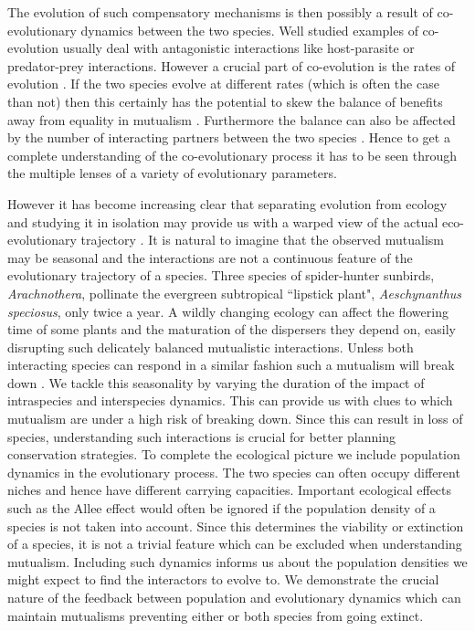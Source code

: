 \documentclass[12pt]{article}
\begin{document}
The evolution of such compensatory mechanisms is then possibly a result of co-evolutionary dynamics between the two species.
Well studied examples of co-evolution usually deal with antagonistic interactions like host-parasite or predator-prey interactions.
However a crucial part of co-evolution is the rates of evolution \citep{salathe:TREE:2008}.
If the two species evolve at different rates (which is often the case than not) then this certainly has the potential to skew the balance of benefits away from equality in mutualism \citep{bergstrom:PNAS:2003}.
Furthermore the balance can also be affected by the number of interacting partners between the two species \citep{gokhale:PRSB:2012}.
Hence to get a complete understanding of the co-evolutionary process it has to be seen through the multiple lenses of a variety of evolutionary parameters.

However it has become increasing clear that separating evolution from ecology and studying it in isolation may provide us with a warped view of the actual eco-evolutionary trajectory \citep{sanchez:PLoSB:2013}.
It is natural to imagine that the observed mutualism may be seasonal and the interactions are not a continuous feature of the evolutionary trajectory of a species. 
Three species of spider-hunter sunbirds, \textit{Arachnothera}, pollinate the evergreen subtropical ``lipstick plant", \textit{Aeschynanthus speciosus}, only twice a year.
A wildly changing ecology can affect the flowering time of some plants and the maturation of the dispersers they depend on, easily disrupting such delicately balanced mutualistic interactions. 
Unless both interacting species can respond in a similar fashion such a mutualism will break down \citep{warren:GCB:2014}.
We tackle this seasonality by varying the duration of the impact of intraspecies and interspecies dynamics.
This can provide us with clues to which mutualism are under a high risk of breaking down.
Since this can result in loss of species, understanding such interactions is crucial for better planning conservation strategies.
To complete the ecological picture we include population dynamics in the evolutionary process.
The two species can often occupy different niches and hence have different carrying capacities.
Important ecological effects such as the Allee effect would often be ignored if the population density of a species is not taken into account.
Since this determines the viability or extinction of a species, it is not a trivial feature which can be excluded when understanding mutualism.
Including such dynamics informs us about the population densities we might expect to find the interactors to evolve to.
We demonstrate the crucial nature of the feedback between population and evolutionary dynamics which can maintain mutualisms preventing either or both species from going extinct.
\end{document}
